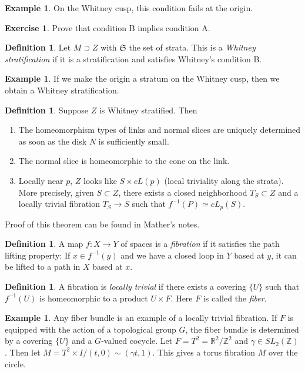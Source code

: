 \documentclass[leqno, openany]{memoir}
\theoremstyle{definition}
\newtheorem{defn}[thm]{Definition}
\newtheorem{exm}[thm]{Example}
\newtheorem{exer}[thm]{Exercise}
\theoremstyle{remark}
\theoremstyle{plain}
\theoremstyle{definition}
\theoremstyle{remark}
\newcommand{\R}{\mathbb{R}}
\newcommand{\Z}{\mathbb{Z}}
\newcommand{\mf}[1]{\mathfrak{#1}}
\begin{document}
\begin{exm}
    On the Whitney cusp, this condition fails at the origin.
\end{exm}

\begin{exer}
    Prove that condition B implies condition A.
\end{exer}

\begin{defn}
    Let $M \supset Z$ with $\mf{S}$ the set of strata. This is a \textit{Whitney stratification} if it is a stratification and satisfies Whitney's condition B.
\end{defn}

\begin{exm}
    If we make the origin a stratum on the Whitney cusp, then we obtain a Whitney stratification.
\end{exm}

\begin{defn}
    Suppose $Z$ is Whitney stratified. Then
    \begin{enumerate}
        \item The homeomorphism types of links and normal slices are uniquely determined as soon as the disk $N$ is sufficiently small.
        \item The normal slice is homeomorphic to the cone on the link.
        \item Locally near $p$, $Z$ looks like $S \times cL(p)$ (local triviality along the strata). More precisely, given $S \subset Z$, there exists a closed neighborhood $T_S \subset Z$ and a locally trivial fibration $T_S \to S$ such that $f^{-1}(P) \simeq cL_p(S)$.
    \end{enumerate}
\end{defn}
Proof of this theorem can be found in Mather's notes.

\begin{defn}
    A map $f: X \to Y$ of spaces is a \textit{fibration} if it satisfies the path lifting property: If $x \in f^{-1}(y)$ and we have a closed loop in $Y$ based at $y$, it can be lifted to a path in $X$ based at $x$.
\end{defn}

\begin{defn}
    A fibration is \textit{locally trivial} if there exists a covering $\{U\}$ such that $f^{-1}(U)$ is homeomorphic to a product $U \times F$. Here $F$ is called the \textit{fiber}.
\end{defn}

\begin{exm}
    Any fiber bundle is an example of a locally trivial fibration. If $F$ is equipped with the action of a topological group $G$, the fiber bundle is determined by a covering $\{ U \}$ and a $G$-valued cocycle. Let $F = T^2 = \R^2 / \Z^2$ and $\gamma \in SL_2(\Z)$. Then let $M = T^2 \times I / (t,0) \sim (\gamma t, 1)$. This gives a torus fibration $M$ over the circle.
\end{exm}
\end{document}
